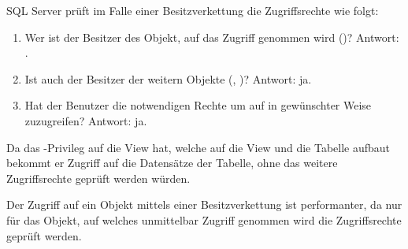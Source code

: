           SQL Server prüft im Falle einer Besitzverkettung die Zugriffsrechte
          wie folgt:
          \begin{enumerate}
            \item Wer ist der Besitzer des Objekt, auf das Zugriff genommen
            wird ()? Antwort:
            .
            \item Ist  auch der Besitzer der weitern Objekte
            (, )?
            Antwort: ja.
            \item Hat der Benutzer  die notwendigen Rechte um
            auf  in gewünschter Weise
            zuzugreifen? Antwort: ja.
          \end{enumerate}
          Da  das -Privileg auf die View
           hat, welche auf die View
           und die Tabelle
           aufbaut bekommt er Zugriff auf die Datensätze
          der Tabelle, ohne das weitere Zugriffsrechte geprüft werden würden.
          \begin{merke}
            Der Zugriff auf ein Objekt mittels einer Besitzverkettung ist
            performanter, da nur für das Objekt, auf welches unmittelbar
            Zugriff genommen wird die Zugriffsrechte geprüft werden.
          \end{merke}
